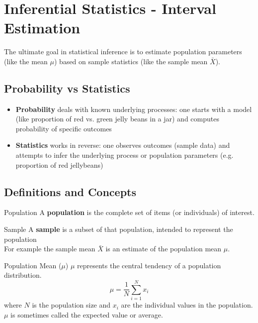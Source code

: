 \documentclass[10pt]{extarticle}
\begin{document}
\pagebreak

\tableofcontents
\pagebreak

\section{Inferential Statistics - Interval Estimation}
The ultimate goal in statistical inference is to estimate population parameters (like the mean $\mu$) based on sample statistics (like the sample mean $\bar{X}$).
\subsection{Probability vs Statistics}
\begin{itemize}
    \item \textbf{Probability} deals with known underlying processes: one starts with a model (like proportion of red vs. green jelly beans in a jar) and computes probability of specific outcomes
    \item \textbf{Statistics} works in reverse: one observes outcomes (sample data) and attempts to infer the underlying process or population parameters (e.g. proportion of red jellybeans)
\end{itemize}
\subsection{Definitions and Concepts}

\begin{definitionbox}{Population}{}
    A \textbf{population} is the complete set of items (or individuals) of interest.
\end{definitionbox}

\begin{definitionbox}{Sample}{}
    A \textbf{sample} is a subset of that population, intended to represent the population\\

    For example the sample mean $\bar{X}$ is an estimate of the population mean $\mu$.
\end{definitionbox}

\begin{definitionbox}{Population Mean ($\mu$)}{}
    $\mu$ represents the central tendency of a population distribution.
    $$\mu = \frac{1}{N} \sum_{i=1}^{N} x_i$$
    where $N$ is the population size and $x_i$ are the individual values in the population.\\

    $\mu$ is sometimes called the expected value or average.
\end{definitionbox}
\end{document}
